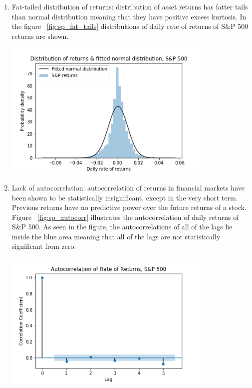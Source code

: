 \begin{enumerate}
    \item Fat-tailed distribution of returns: distribution of asset returns has fatter tails than normal distribution meaning that they have positive excess kurtosis. 
          In the figure  ~\ref{fig:sp_fat_tails} distributions of daily rate of returns of S\&P 500 returns are shown.
    \par
    \begin{minipage}{\linewidth}
        \centering
        \includegraphics[width=10cm]{plots/S&P500_fat_tails.png}
        \label{fig:sp_fat_tails}
    \end{minipage}
    \item Lack of autocorrelation: autocorrelation of returns in financial markets have been shown to be statistically insignificant, except in the very short term. 
          Previous returns have no predictive power over the future returns of a stock. 
          Figure ~\ref{fig:sp_autocorr} illustrates the autocorrelation of daily returns of S\&P 500.
          As seen in the figure, the autocorrelations of all of the lags lie inside the blue area meaning that all of the lags 
          are not statistically significant from zero.
    \par
    \begin{minipage}{\linewidth}
        \centering
        \includegraphics[width=10cm]{plots/S&P500_autocorr.png}

\end{minipage}
\end{enumerate}

